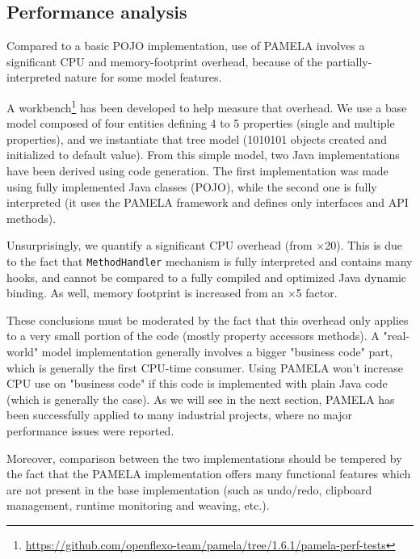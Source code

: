 
\subsection{Performance analysis}

Compared to a basic POJO implementation, use of PAMELA involves a significant CPU and memory-footprint overhead, because of the partially-interpreted nature for some model features.

A workbench\footnote {\url{https://github.com/openflexo-team/pamela/tree/1.6.1/pamela-perf-tests}} has been developed to help measure that overhead. We use a base model composed of four entities defining 4 to 5 properties (single and multiple properties), and we instantiate that tree model (1010101 objects created and initialized to default value). From this simple model, two Java implementations have been derived using code generation. The first implementation was made using fully implemented Java classes (POJO), while the second one is fully interpreted (it uses the PAMELA framework and defines only interfaces and API methods). 

Unsurprisingly, we quantify a significant CPU overhead (from $\times$20). This is due to the fact that \texttt{MethodHandler} mechanism is fully interpreted and contains many hooks, and cannot be compared to a fully compiled and optimized Java dynamic binding. As well, memory footprint is increased from an 
$\times$5 factor.

These conclusions must be moderated by the fact that this overhead only applies
to a very small portion of the code (mostly property accessors methods). A "real-world" model implementation generally involves a bigger "business code" part, which is generally the first CPU-time consumer. Using PAMELA won’t increase CPU use on "business code" if this code is implemented with plain Java code (which is generally the case). As we will see in the next section, PAMELA has been successfully applied to many industrial projects, where no major performance issues were reported.

Moreover, comparison between the two implementations should be tempered by the fact that the PAMELA implementation offers many functional features which are not present in the base implementation (such as undo/redo, clipboard management, runtime monitoring and weaving, etc.).


